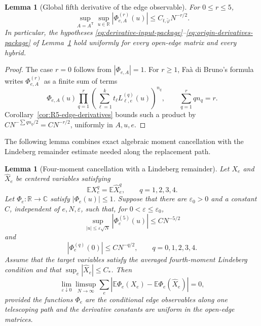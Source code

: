 \documentclass[11pt]{article}
\newtheorem{lemma}[theorem]{Lemma}
\theoremstyle{definition}
\theoremstyle{remark}
\newcommand{\E}{\mathbb E}
\newcommand{\R}{\mathbb R}
\begin{document}
\begin{lemma}[Global fifth derivative of the edge observable]
\label{lem:R5-Phi-derivatives}
For \(0\le r\le5\),
\begin{equation}\label{eq:R5-Phi-bound}
 \sup_{A=A^{\mathsf T}}\sup_{u\in\mathbb R}
 |\Phi_{e,A}^{(r)}(u)|
 \le C_{t,\widetilde\varphi}N^{-r/2}.
\end{equation}
In particular, the hypotheses
\eqref{eq:derivative-input-package}--\eqref{eq:origin-derivatives-package}
of Lemma~\ref{lem:four-moment-cancel-package} hold uniformly for every
open-edge matrix and every hybrid.
\end{lemma}

\begin{proof}
The case \(r=0\) follows from \(|\Phi_{e,A}|=1\).  For \(r\ge1\),
Fa\`a di Bruno's formula writes \(\Phi_{e,A}^{(r)}\) as a finite sum of
terms
\[
 \Phi_{e,A}(u)
 \prod_{q=1}^r
 \left(\sum_{\ell=1}^kt_\ell
 L_{\ell,e}^{(q)}(u)\right)^{n_q},
 \qquad
 \sum_{q=1}^r qn_q=r.
\]
Corollary~\ref{cor:R5-edge-derivatives} bounds such a product by
\(C N^{-\sum qn_q/2}=CN^{-r/2}\), uniformly in \(A,u,e\).
\end{proof}

The following lemma combines exact algebraic moment cancellation with the
Lindeberg remainder estimate needed along the replacement path.

\begin{lemma}[Four-moment cancellation with a Lindeberg remainder]
\label{lem:four-moment-cancel-package}
Let $X_e$ and $\widehat X_e$ be centered variables satisfying
\begin{equation}\label{eq:four-match-lemma-package}
 \E X_e^q=\E\widehat X_e^q,
 \qquad q=1,2,3,4.
\end{equation}
Let $\Phi_e:\R\to\mathbb C$ satisfy $|\Phi_e(u)|\le1$.  Suppose that
there are $\varepsilon_0>0$ and a constant $C$, independent of
$e,N,\varepsilon$, such that, for $0<\varepsilon\le\varepsilon_0$,
\begin{equation}\label{eq:derivative-input-package}
 \sup_{|u|\le\varepsilon\sqrt N}
 |\Phi_e^{(5)}(u)|\le C N^{-5/2}
\end{equation}
and
\begin{equation}\label{eq:origin-derivatives-package}
 |\Phi_e^{(q)}(0)|\le C N^{-q/2},
 \qquad q=0,1,2,3,4.
\end{equation}
Assume that the target variables satisfy the averaged fourth-moment Lindeberg
condition and that $\sup_e|\widehat X_e|\le C_*$.  Then
\begin{equation}\label{eq:four-comparison-error-package}
 \lim_{\varepsilon\downarrow0}
 \limsup_{N\to\infty}
 \sum_e
 \left|
 \E\Phi_e(X_e)-\E\Phi_e(\widehat X_e)
 \right|=0,
\end{equation}
provided the functions $\Phi_e$ are the conditional edge observables along
one telescoping path and the derivative constants are uniform in the open-edge
matrices.
\end{lemma}
\end{document}
